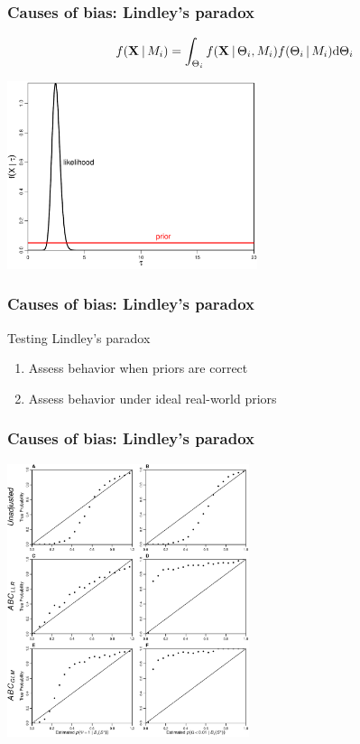 \begin{frame}
    \frametitle{Causes of bias: Lindley's paradox}
    \begin{displaybox}[7.5cm]
        \[
            f(\alignmentVector \given M_i) = \int_{\Theta_i} f(\alignmentVector
            \given \Theta_i, M_i) f(\Theta_i \given M_i) \mathrm{d}\Theta_i
        \]\vspace{0mm}
    \end{displaybox}
    \smallskip
    \centerline{
    \includegraphics[height=5.5cm]{images/likelihood-vs-prior-example.pdf}}
\end{frame}

\begin{frame}
    \frametitle{Causes of bias: Lindley's paradox}
    Testing Lindley's paradox \\
    \begin{enumerate}
        \item Assess behavior when priors are correct
        \item Assess behavior under ideal real-world priors
    \end{enumerate}
\end{frame}

\begin{frame}
    \frametitle{Causes of bias: Lindley's paradox}
    \centerline{
    \includegraphics[height=8cm]{images/posterior_vs_true_prob.pdf}}
\end{frame}

